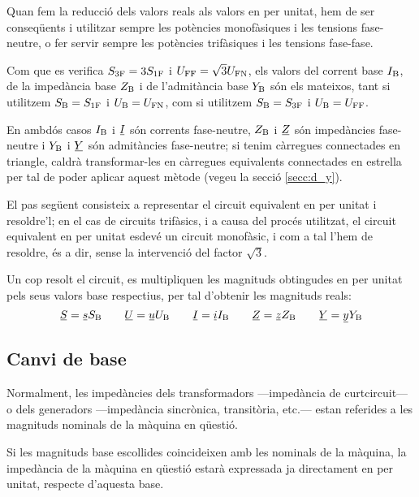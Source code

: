  Quan fem la reducció dels valors reals als valors en per unitat, hem de ser conseqüents i utilitzar sempre les potències monofàsiques i les tensions fase-neutre, o fer servir sempre les potències trifàsiques i les tensions fase-fase.

 Com que es verifica $S_\mathrm{3F}=3 S_\mathrm{1F}$ i $U_\mathrm{FF}=\sqrt{3}U_\mathrm{FN}$, els valors  del corrent base $I_\mathrm{B}$, de la impedància base $Z_\mathrm{B}$ i  de l'admitància base $Y_\mathrm{B}$ són els mateixos, tant si utilitzem $S_\mathrm{B}=S_\mathrm{1F}$ i $U_\mathrm{B}=U_\mathrm{FN}$, com si utilitzem $S_\mathrm{B}=S_\mathrm{3F}$ i $U_\mathrm{B}=U_\mathrm{FF}$.

 En ambdós casos $I_\mathrm{B}$ i $\cmplx{I}$ són corrents fase-neutre, $Z_\mathrm{B}$ i $\cmplx{Z}$ són impedàncies  fase-neutre i $Y_\mathrm{B}$ i $\cmplx{Y}$ són admitàncies fase-neutre; si tenim càrregues connectades en triangle, caldrà transformar-les en càrregues equivalents connectades en estrella per tal de poder aplicar aquest mètode (vegeu la secció \ref{secc:d_y}).

El pas següent consisteix a representar el circuit equivalent en
per unitat i resoldre'l; en el cas de circuits trifàsics, i a causa del procés utilitzat, el circuit equivalent en per unitat esdevé un circuit monofàsic, i com a tal l'hem de resoldre, és a dir, sense la intervenció del factor $\sqrt{3}$.

Un cop resolt el circuit, es multipliquen les magnituds obtingudes en per unitat pels
seus valors base respectius, per tal d'obtenir les magnituds reals:
\begin{equation}
   \cmplx{S} = \cmplx{s} S\ped{B} \qquad \cmplx{U} = \cmplx{u} U\ped{B} \qquad \cmplx{I} = \cmplx{i} I\ped{B} \qquad \cmplx{Z} = \cmplx{z} Z\ped{B} \qquad \cmplx{Y} = \cmplx{y} Y\ped{B}
\end{equation}

\subsection{Canvi de base}\label{sec:canvi-base} 

Normalment, les impedàncies dels transformadors ---impedància de curtcircuit--- o dels generadors ---impedància sincrònica, transitòria, etc.--- estan referides a les magnituds nominals de la màquina en qüestió.


Si les magnituds base escollides coincideixen amb les nominals de la màquina,
la impedància de la màquina en qüestió estarà expressada ja directament en per unitat, respecte d'aquesta base.

